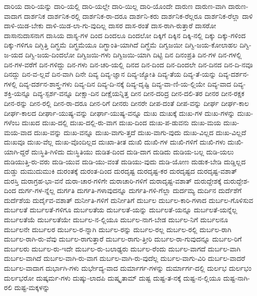 {ದಾರಿಯ
ದಾರಿ-ಯನ್ನು
ದಾರಿ-ಯಲ್ಲಿ
ದಾರಿ-ಯಲ್ಲೇ
ದಾರಿ-ಯಿಲ್ಲ
ದಾರಿ-ಯೊಂದೇ
ದಾರುಣ
ದಾರುಣ-ವಾಗಿ
ದಾರುಣ-ವಾದಾಗ
ದಾರ್ಶನಿಕ
ದಾರ್ಶನಿಕ-ರಲ್ಲಿ
ದಾರ್ಶನಿಕ-ರಾ-ದರೂ
ದಾರ್ಶನಿ-ಕರು
ದಾರ್ಶನಿಕ-ರೆಲ್ಲರೂ
ದಾರ್ಶನಿಕ-ರೆಲ್ಲಾ
ದಾಳಿ
ದಾಳಿ-ಯಿಡ-ಬೇಕು
ದಾಳಿ-ಯಿಡ-ಲಾ-ಗು-ವುದಿಲ್ಲ
ದಾಸರ
ದಾಸ-ರಂತೆ
ದಾಸ-ರಾಗಿ-ರುತ್ತಾರೆ
ದಾಸರೋ
ದಾಸಾನುದಾಸನಾಗ
ದಾಸಿಯ
ದಾಸ್ಯ-ಗಳ
ದಿಂದ
ದಿಂದಲೂ
ದಿಂದಲೋ
ದಿಕ್ಕಿಗೆ
ದಿಕ್ಕಿನ
ದಿಕ್ಕಿ-ನಲ್ಲಿ
ದಿಕ್ಕು
ದಿಕ್ಕು-ಗಳಿಂದ
ದಿಕ್ಕು-ಗಳಿಗೂ
ದಿಗ್ಭಿತ್ತಿ
ದಿಗ್ಭ್ರಮೆ
ದಿಗ್ಭ್ರಮೆಯೂ
ದಿಗ್ಭ್ರಾಂತಿ-ಯಾಗಿದೆ
ದಿಗ್ಭ್ರೆಮೆ
ದಿಗ್ವಜಯೀ
ದಿಗ್ವಿ-ಜಯ-ಕೋಲಾಹಲ
ದಿಗ್ವಿ-ಜ-ಯದ
ದಿಗ್ವಿ-ಜಯ-ದಿಂದಲೋ
ದಿಗ್ವಿಜಯಿ-ಗಳು
ದಿಗ್ವಿಜಯಿ-ಯಾಗಿ
ದಿಟ್ಟಿ
ದಿನ
ದಿನಂಪ್ರತಿ
ದಿನ-ಗಳ
ದಿನ-ಗಳಲ್ಲಿ
ದಿನ-ಗಳ-ವರೆಗೆ
ದಿನ-ಗಳಿದ್ದು
ದಿನ-ಗಳು
ದಿನ-ಚರಿ-ಯಲ್ಲಿ
ದಿನದ
ದಿನ-ದಿಂದ
ದಿನ-ದಿಂದಲೇ
ದಿನ-ದಿನದ
ದಿನ-ದಿ-ನವೂ
ದಿನದ್ದು
ದಿನ-ವ-ಲ್ಲವೆ
ದಿನ-ವಾಗಿ
ದಿನೇ
ದಿವ್ಯ
ದಿವ್ಯ-ಜ್ಞಾನ
ದಿವ್ಯ-ಜ್ಯೋತಿ
ದಿವ್ಯ-ತೆಯ
ದಿವ್ಯ-ತೆ-ಯನ್ನು
ದಿವ್ಯ-ದರ್ಶನ-ಗಳಲ್ಲಿ
ದಿವ್ಯ-ದರ್ಶನ-ಶಾಸ್ತ್ರ-ಗಳು
ದಿವ್ಯ-ದಿನ
ದಿವ್ಯ-ದಿ-ನಕ್ಕೆ
ದಿವ್ಯ-ದೃಷ್ಟಿ
ದಿವ್ಯ-ವಾ-ಣಿ-ಯ-ಲ್ಲಿಯೇ
ದಿವ್ಯ-ವಾದ
ದಿವ್ಯ-ಶಕ್ತಿ-ಯನ್ನೂ
ದಿವ್ಯ-ಸ್ಪರ್ಶ-ವನ್ನೂ
ದೀಕ್ಷಾ-ದಿನ
ದೀಕ್ಷೆಯನ್ನಿತ್ತ
ದೀನ
ದೀನ-ದರಿದ್ರ
ದೀನ-ದಲಿ-ತರ
ದೀನರ
ದೀನ-ರಕ್ಷಕ
ದೀನ-ರನ್ನು
ದೀನ-ರಲ್ಲಿ
ದೀನ-ರಾ-ದರೂ
ದೀನ-ರಿಗೆ
ದೀನರು
ದೀನರೇ
ದೀಪ-ದಂತೆ
ದೀಪ-ವನ್ನು
ದೀರ್ಘ
ದೀರ್ಘ-ಕಾಲ
ದೀರ್ಘ-ಕಾಲದ
ದೀರ್ಘಾ-ಯುಷ್ಯ-ವನ್ನು
ದೀರ್ಘಾ-ಯುಷ್ಯ-ವನ್ನೂ
ದುಃಖ
ದುಃಖಕ್ಕೆ
ದುಃಖ-ಗಳ
ದುಃಖ-ಗಳನ್ನು
ದುಃಖ-ಗಳೆಂಬ
ದುಃಖದ
ದುಃಖ-ದಲ್ಲಿ
ದುಃಖ-ದಲ್ಲಿ-ರು-ವಾಗ
ದುಃಖ-ದಿಂದ
ದುಃಖ-ಪ-ಡುವನು
ದುಃಖ-ಮಯ
ದುಃಖ-ಮಯ-ವಾದ
ದುಃಖ-ವನ್ನು
ದುಃಖ-ವನ್ನೂ
ದುಃಖ-ವಾಗು-ತ್ತದೆ
ದುಃಖ-ವಾಗು-ವುದು
ದುಃಖ-ವಿಲ್ಲದ
ದುಃಖ-ವಿಲ್ಲದೆ
ದುಃಖವೂ
ದುಃಖ-ವೆಲ್ಲ
ದುಃಖ-ವೊಂದಿಲ್ಲದ
ದುಃಖಾ-ತೀತ
ದುಃಖಿ
ದುಃಖಿ-ಗಳ
ದುಃಖಿ-ಗಳಿಗೆ
ದುಃಖಿ-ಗಳು
ದುಃಖಿ-ಯಾಗಿ-ದ್ದರೆ
ದುಃಸ್ಥಿತಿ-ಗಿಳಿದು
ದುಃಸ್ಥಿತಿಯು
ದುಡಿತ-ದಿಂದ
ದುಡಿ-ದಾಗ
ದುಡಿದು
ದುಡಿಯ-ಬಲ್ಲ
ದುಡಿ-ಯಲು
ದುಡಿಯುತ್ತಿ-ರು-ವರು
ದುಡಿ-ಯುವ
ದುಡಿ-ಯು-ವಂತೆ
ದುಡಿಯು-ವುದು
ದುಡಿ-ಯೋಣ
ದುಡುಕ-ಬೇಡಿ
ದುಡ್ಡಿಲ್ಲದ
ದುಡ್ಡು
ದುಮುದುಮುಕಿ
ದುರಂತಕ್ಕೆ
ದುರಂತ-ದಿಂದ
ದುರದೃಷ್ಟ
ದುರದೃಷ್ಟ-ಕರ
ದುರದೃಷ್ಟದ
ದುರದೃಷ್ಟ-ವಶಾತ್
ದುರಸ್ತಿ
ದುರಾಗ್ರಹ-ಭಾ-ವನೆ
ದುರಾ-ಚಾರ-ಗಳಿಗೇ
ದುರಾಚಾರಿ-ಗಳಿಗೆ
ದುರಾದೃಷ್ಟ-ವಶಾತ್
ದುರುದ್ದೇಶಕ್ಕೆ
ದುರುದ್ದೇಶ-ದಿಂದ
ದುರ್ಗ-ಗಳ-ನ್ನೆಲ್ಲ
ದುರ್ಗತಿ
ದುರ್ಗತಿ-ಗಳಾವುದನ್ನೂ
ದುರ್ಗತಿ-ಗಳಿ-ಗೆಲ್ಲಾ
ದುರ್ದಮ್ಯ
ದುರ್ದಿನ
ದುರ್ದೆಶೆಗೆ
ದುರ್ದೆಶೆಯ
ದುರ್ದೈವ-ವಶಾತ್
ದುರ್ನೀತಿ-ಗಳಿಗೆ
ದುರ್ನೀತಿಗೆ
ದುರ್ಬಲ
ದುರ್ಬಲ-ಕಾರಿ-ಗಳಾದ
ದುರ್ಬಲ-ಗೊಳಿಸುವ
ದುರ್ಬಲತೆ
ದುರ್ಬಲತೆ-ಗಳಿಗೂ
ದುರ್ಬಲತೆಯ
ದುರ್ಬಲತೆ-ಯನ್ನು
ದುರ್ಬಲತೆ-ಯನ್ನೂ
ದುರ್ಬಲತೆ-ಯನ್ನೆಲ್ಲ
ದುರ್ಬಲತೆಯೆ
ದುರ್ಬಲತೆಯೇ
ದುರ್ಬಲ-ನ-ಲ್ಲಿಯೂ
ದುರ್ಬಲ-ನಾಗ-ಬೇಡ
ದುರ್ಬಲ-ನಿಗೆ
ದುರ್ಬಲನೂ
ದುರ್ಬಲನೇ
ದುರ್ಬಲರ
ದುರ್ಬಲ-ರ-ನ್ನಾಗಿ
ದುರ್ಬಲ-ರನ್ನು
ದುರ್ಬಲ-ರಲ್ಲ
ದುರ್ಬಲ-ರಲ್ಲಿ
ದುರ್ಬಲ-ರಾಗಿ
ದುರ್ಬಲ-ರಾಗಿ-ರು-ವೆವು
ದುರ್ಬಲ-ರಾಗುತ್ತಾರೆ
ದುರ್ಬಲ-ರಾಗು-ತ್ತೀರಿ
ದುರ್ಬಲ-ರಾ-ಗುವುದನ್ನೂ
ದುರ್ಬಲ-ರಿಗೆ
ದುರ್ಬಲರು
ದುರ್ಬಲ-ರು-ಇದೇ
ದುರ್ಬಲ-ರು-ಬಲಾಢ್ಯರು
ದುರ್ಬಲ-ರೆಂದು
ದುರ್ಬಲ-ವಾಗದೆ
ದುರ್ಬಲ-ವಾಗಿ
ದುರ್ಬಲ-ವಾಗಿದೆ
ದುರ್ಬಲ-ವಾಗಿ-ರು-ವಾಗ
ದುರ್ಬಲ-ವಾಗಿ-ರು-ವುದೆಲ್ಲ
ದುರ್ಬಲ-ವಾಗು-ವಿರಿ
ದುರ್ಬಲ-ವಾದರೆ
ದುರ್ಬಲ-ವಾದಾಗ
ದುರ್ಭಾಗಿ-ಗಳು
ದುರ್ಭೇದ್ಯ-ವಾದ
ದುರ್ಮಾರ್ಗ-ಗಳನ್ನು
ದುರ್ಮಾರ್ಗ-ದಲ್ಲಿ
ದುರ್ಲಭ
ದುರ್ಲಭಂ
ದುರ್ಲಭರೋ
ದುಷ್ಕರ್ಮ-ಗಳು
ದುಷ್ಕು-ಲಾದಪಿ
ದುಷ್ಕೃತಾಮ್
ದುಷ್ಟ
ದುಷ್ಟ-ತ-ನಕ್ಕೆ
ದುಷ್ಟ-ನ-ಲ್ಲಿಯೂ
ದುಷ್ಟ-ನಾಗಿ-ರಲಿ
ದುಷ್ಟ-ಮಕ್ಕಳನ್ನು
}
